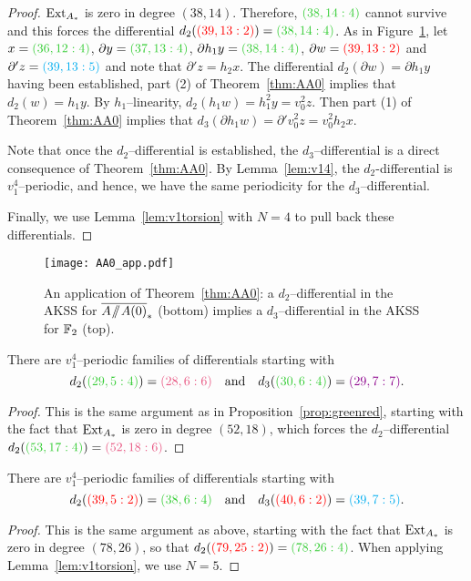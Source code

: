\begin{proof}
$\operatorname{Ext}_{A_*}$ is zero in degree $(38,14)$. Therefore, ${\color{limegreen}(38,14:4)}$ cannot survive and this forces the differential $d_2( {\color{red}(39,13:2)}) = {\color{limegreen}(38,14:4)}$.
As in Figure~\ref{fig:AA0}, let $x =  {\color{limegreen}(36,12:4)}$, $\partial y =  {\color{limegreen}(37,13:4)}$, $\partial h_1y =  {\color{limegreen}(38,14:4)}$, $\partial w = {\color{red}(39,13:2)}$ and $\partial'z = {\color{cyan}(39,13:5)}$ and note that $\partial'z = h_2x$.
The differential
$d_2( \partial w) = \partial h_1 y $ having been established, part (2)  of Theorem~\ref{thm:AA0} implies that $d_2(w) = h_1y$. By $h_1$--linearity, $d_2(h_1w) = h_1^2 y = v_0^2 z$. Then part (1) of Theorem~\ref{thm:AA0} implies that $d_3(\partial h_1w) = \partial' v_0^2 z = v_0^2 h_2x$.

Note that once the $d_2$--differential is established, the $d_3$--differential is a direct consequence of Theorem~\ref{thm:AA0}. By Lemma~\ref{lem:v14}, the $d_2$-differential is $v_1^4$--periodic, and hence, we have the same periodicity for the $d_3$--differential.

Finally, we use Lemma~\ref{lem:v1torsion} with $N=4$ to pull back these differentials. 
\end{proof}



\begin{figure}
\texttt{[image: AA0\_app.pdf]}
\caption{An application of Theorem~\ref{thm:AA0}: a $d_2$--differential in the AKSS for $\AA0$ (bottom) implies a $d_3$--differential in the AKSS for $\mathbb{F}_2$ (top).}\label{fig:AA0}
\end{figure}

\begin{prop}
There are $v_1^4$--periodic families of differentials starting with
\[d_2( {\color{limegreen}(29,5:4)}) = {\color{lavenderrose}(28,6:6)} \ \ \ \text{and} \ \ \  d_3( {\color{limegreen}(30,6:4)}) = {\color{darkmagenta}(29,7:7)} .\]
\end{prop}
\begin{proof}
This is the same argument as in Proposition~\ref{prop:greenred}, starting with the fact that $\operatorname{Ext}_{A_*}$ is zero in degree $(52,18)$, which forces the $d_2$--differential $d_2( {\color{limegreen}(53,17:4)}) = {\color{lavenderrose}(52,18:6)}$.
\end{proof}


\begin{prop}
There are $v_1^4$--periodic families of differentials starting with
\[d_2( {\color{red}(39,5:2)}) = {\color{limegreen}(38,6:4)} \ \ \ \text{and} \ \ \  d_3( {\color{red}(40,6:2)} ) = {\color{cyan}(39,7:5)}.\]
\end{prop}
\begin{proof}
This is the same argument as above, starting with the fact that $\operatorname{Ext}_{A_*}$ is zero in degree $(78,26)$, so that $d_2( {\color{red}(79,25:2)}) = {\color{limegreen}(78,26:4)}$. When applying Lemma~\ref{lem:v1torsion}, we use $N=5$.
\end{proof}


